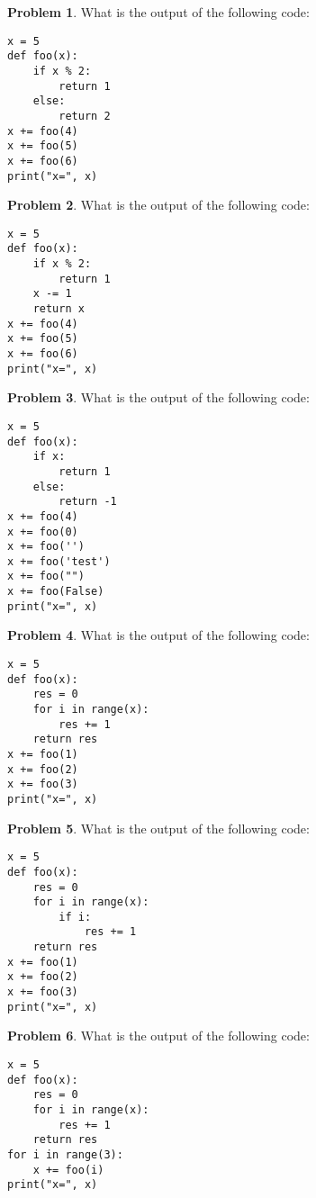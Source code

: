 \documentclass[10pt]{article}
\theoremstyle{definition}
\newtheorem{problem}{Problem}
\begin{document}
\newpage
\begin{problem}
    What is the output of the following code:
\end{problem}
\begin{lstlisting}
x = 5
def foo(x):
    if x % 2:
        return 1
    else:
        return 2
x += foo(4)
x += foo(5)
x += foo(6)
print("x=", x)
\end{lstlisting}
\vspace{2in}


\begin{problem}
    What is the output of the following code:
\end{problem}
\begin{lstlisting}
x = 5
def foo(x):
    if x % 2:
        return 1
    x -= 1
    return x
x += foo(4)
x += foo(5)
x += foo(6)
print("x=", x)
\end{lstlisting}
\vspace{2in}


\newpage
\begin{problem}
    What is the output of the following code:
\end{problem}
\begin{lstlisting}
x = 5
def foo(x):
    if x:
        return 1
    else:
        return -1
x += foo(4)
x += foo(0)
x += foo('')
x += foo('test')
x += foo("")
x += foo(False)
print("x=", x)
\end{lstlisting}
\vspace{2in}


\begin{problem}
    What is the output of the following code:
\end{problem}
\begin{lstlisting}
x = 5
def foo(x):
    res = 0
    for i in range(x):
        res += 1
    return res
x += foo(1)
x += foo(2)
x += foo(3)
print("x=", x)
\end{lstlisting}
\vspace{2in}


\newpage
\begin{problem}
    What is the output of the following code:
\end{problem}
\begin{lstlisting}
x = 5
def foo(x):
    res = 0
    for i in range(x):
        if i:
            res += 1
    return res
x += foo(1)
x += foo(2)
x += foo(3)
print("x=", x)
\end{lstlisting}
\vspace{2in}


\begin{problem}
    What is the output of the following code:
\end{problem}
\begin{lstlisting}
x = 5
def foo(x):
    res = 0
    for i in range(x):
        res += 1
    return res
for i in range(3):
    x += foo(i)
print("x=", x)
\end{lstlisting}
\vspace{2in}
\end{document}
